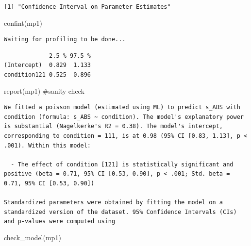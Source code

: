 \documentclass[
  letterpaper,
  DIV=11,
  numbers=noendperiod]{scrreprt}
\newenvironment{Shaded}{\begin{snugshade}}{\end{snugshade}}
\newcommand{\CommentTok}[1]{\textcolor[rgb]{0.37,0.37,0.37}{#1}}
\newcommand{\FunctionTok}[1]{\textcolor[rgb]{0.28,0.35,0.67}{#1}}
\newcommand{\NormalTok}[1]{\textcolor[rgb]{0.00,0.23,0.31}{#1}}
\begin{document}
\begin{verbatim}
[1] "Confidence Interval on Parameter Estimates"
\end{verbatim}

\begin{Shaded}
\begin{Highlighting}[]
\FunctionTok{confint}\NormalTok{(mp1)}
\end{Highlighting}
\end{Shaded}

\begin{verbatim}
Waiting for profiling to be done...
\end{verbatim}

\begin{verbatim}
             2.5 % 97.5 %
(Intercept)  0.829  1.133
condition121 0.525  0.896
\end{verbatim}

\begin{Shaded}
\begin{Highlighting}[]
\FunctionTok{report}\NormalTok{(mp1) }\CommentTok{\#sanity check}
\end{Highlighting}
\end{Shaded}

\begin{verbatim}
We fitted a poisson model (estimated using ML) to predict s_ABS with condition (formula: s_ABS ~ condition). The model's explanatory power is substantial (Nagelkerke's R2 = 0.38). The model's intercept, corresponding to condition = 111, is at 0.98 (95% CI [0.83, 1.13], p < .001). Within this model:

  - The effect of condition [121] is statistically significant and positive (beta = 0.71, 95% CI [0.53, 0.90], p < .001; Std. beta = 0.71, 95% CI [0.53, 0.90])

Standardized parameters were obtained by fitting the model on a standardized version of the dataset. 95% Confidence Intervals (CIs) and p-values were computed using 
\end{verbatim}

\begin{Shaded}
\begin{Highlighting}[]
\FunctionTok{check\_model}\NormalTok{(mp1)}
\end{Highlighting}
\end{Shaded}
\end{document}
